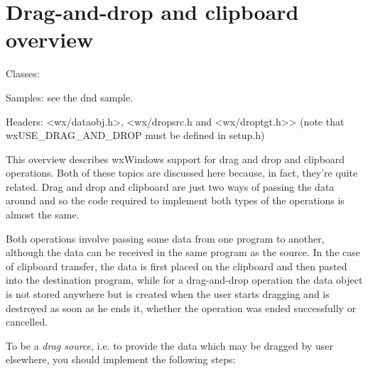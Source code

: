 \section{Drag-and-drop and clipboard overview}\label{wxdndoverview}

Classes: 


Samples: see the dnd sample.

Headers: <wx/dataobj.h>, <wx/dropsrc.h and <wx/droptgt.h>>
(note that wxUSE\_DRAG\_AND\_DROP must be defined in setup.h)

This overview describes wxWindows support for drag and drop and clipboard
operations. Both of these topics are discussed here because, in fact, they're
quite related. Drag and drop and clipboard are just two ways of passing the
data around and so the code required to implement both types of the operations
is almost the same.

Both operations involve passing some data from one program to another,
although the data can be received in the same program as the source. In the case
of clipboard transfer, the data is first placed on the clipboard and then
pasted into the destination program, while for a drag-and-drop operation the
data object is not stored anywhere but is created when the user starts
dragging and is destroyed as soon as he ends it, whether the operation was
ended successfully or cancelled.

To be a {\it drag source}, i.e. to provide the data which may be dragged by
user elsewhere, you should implement the following steps:

